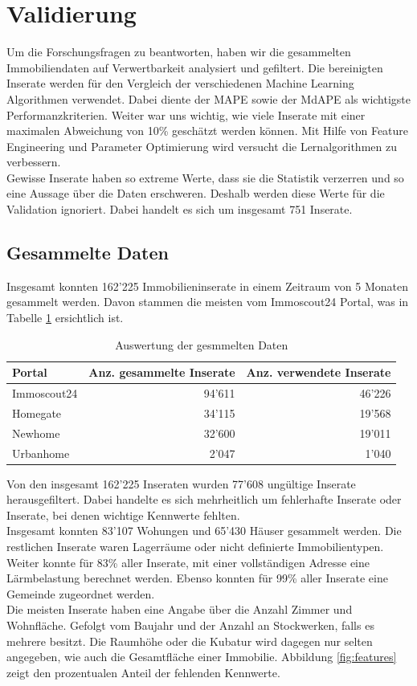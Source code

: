 \section{Validierung}
Um die Forschungsfragen zu beantworten, haben wir die gesammelten Immobiliendaten auf Verwertbarkeit analysiert und gefiltert. Die bereinigten Inserate werden für den Vergleich der verschiedenen Machine Learning Algorithmen verwendet. Dabei diente der MAPE sowie der MdAPE als wichtigste Performanzkriterien. Weiter war uns wichtig, wie viele Inserate mit einer maximalen Abweichung von 10\% geschätzt werden können. Mit Hilfe von Feature Engineering und Parameter Optimierung wird versucht die Lernalgorithmen zu verbessern.\\
Gewisse Inserate haben so extreme Werte, dass sie die Statistik verzerren und so eine Aussage über die Daten erschweren. Deshalb werden diese Werte für die Validation ignoriert. Dabei handelt es sich um insgesamt 751 Inserate.

\subsection{Gesammelte Daten}
Insgesamt konnten 162’225 Immobilieninserate in einem Zeitraum von 5 Monaten gesammelt werden. Davon stammen die meisten vom Immoscout24 Portal, was in Tabelle \ref{tab:crawled_data} ersichtlich ist.

\begin{table}[ht]
\centering
{}
\begin{tabular}{@{}lrr@{}}
\toprule
Portal &  Anz. gesammelte Inserate & Anz. verwendete Inserate \\
\midrule
Immoscout24 & 94'611 & 46'226\\
Homegate & 34'115 & 19'568\\
Newhome & 32'600 & 19'011\\
Urbanhome & 2'047 & 1'040\\
\bottomrule
\end{tabular}
\caption{Auswertung der gesmmelten Daten}
\label{tab:crawled_data}
\end{table}

Von den insgesamt 162’225 Inseraten wurden 77’608 ungültige Inserate herausgefiltert.
Dabei handelte es sich mehrheitlich um fehlerhafte Inserate oder Inserate, bei denen wichtige Kennwerte fehlten.\\
Insgesamt konnten 83’107 Wohungen und 65’430 Häuser gesammelt werden. Die restlichen Inserate waren Lagerräume oder nicht definierte Immobilientypen.\\
Weiter konnte für 83\% aller Inserate, mit einer vollständigen Adresse eine Lärmbelastung berechnet werden. Ebenso konnten für 99\% aller Inserate eine Gemeinde zugeordnet werden.\\
Die meisten Inserate haben eine Angabe über die Anzahl Zimmer und Wohnfläche. Gefolgt vom Baujahr und der Anzahl an Stockwerken, falls es mehrere besitzt. Die Raumhöhe oder die Kubatur wird dagegen nur selten angegeben, wie auch die Gesamtfläche einer Immobilie. Abbildung \ref{fig:features} zeigt den prozentualen Anteil der fehlenden Kennwerte.

